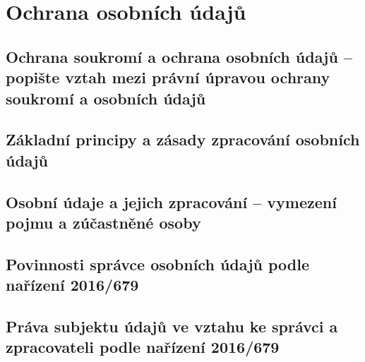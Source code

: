 \section{Ochrana osobních údajů}

\subsection{Ochrana soukromí a ochrana osobních údajů -- popište vztah mezi právní úpravou ochrany soukromí a osobních údajů}


\subsection{Základní principy a zásady zpracování osobních údajů}


\subsection{Osobní údaje a jejich zpracování -- vymezení pojmu a zúčastněné osoby}


\subsection{Povinnosti správce osobních údajů podle nařízení 2016/679}


\subsection{Práva subjektu údajů ve vztahu ke správci a zpracovateli podle nařízení 2016/679}